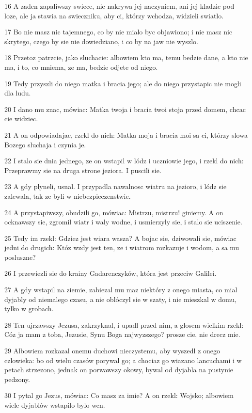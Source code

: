 \par 16 A zaden zapaliwszy swiece, nie nakrywa jej naczyniem, ani jej kladzie pod loze, ale ja stawia na swieczniku, aby ci, którzy wchodza, widzieli swiatlo.
\par 17 Bo nie masz nic tajemnego, co by nie mialo byc objawiono; i nie masz nic skrytego, czego by sie nie dowiedziano, i co by na jaw nie wyszlo.
\par 18 Przetoz patrzcie, jako sluchacie: albowiem kto ma, temu bedzie dane, a kto nie ma, i to, co mniema, ze ma, bedzie odjete od niego.
\par 19 Tedy przyszli do niego matka i bracia jego; ale do niego przystapic nie mogli dla ludu.
\par 20 I dano mu znac, mówiac: Matka twoja i bracia twoi stoja przed domem, chcac cie widziec.
\par 21 A on odpowiadajac, rzekl do nich: Matka moja i bracia moi sa ci, którzy slowa Bozego sluchaja i czynia je.
\par 22 I stalo sie dnia jednego, ze on wstapil w lódz i uczniowie jego, i rzekl do nich: Przeprawmy sie na druga strone jeziora. I puscili sie.
\par 23 A gdy plyneli, usnal. I przypadla nawalnosc wiatru na jezioro, i lódz sie zalewala, tak ze byli w niebezpieczenstwie.
\par 24 A przystapiwszy, obudzili go, mówiac: Mistrzu, mistrzu! giniemy. A on ocknawszy sie, zgromil wiatr i waly wodne, i usmierzyly sie, i stalo sie uciszenie.
\par 25 Tedy im rzekl: Gdziez jest wiara wasza? A bojac sie, dziwowali sie, mówiac jedni do drugich: Któz wzdy jest ten, ze i wiatrom rozkazuje i wodom, a sa mu posluszne?
\par 26 I przewiezli sie do krainy Gadarenczyków, która jest przeciw Galilei.
\par 27 A gdy wstapil na ziemie, zabiezal mu maz niektóry z onego miasta, co mial dyjably od niemalego czasu, a nie oblóczyl sie w szaty, i nie mieszkal w domu, tylko w grobach.
\par 28 Ten ujrzawszy Jezusa, zakrzyknal, i upadl przed nim, a glosem wielkim rzekl: Cóz ja mam z toba, Jezusie, Synu Boga najwyzszego? prosze cie, nie drecz mie.
\par 29 Albowiem rozkazal onemu duchowi nieczystemu, aby wyszedl z onego czlowieka: bo od wielu czasów porywal go; a chociaz go wiazano lancuchami i w petach strzezono, jednak on porwawszy okowy, bywal od dyjabla na pustynie pedzony.
\par 30 I pytal go Jezus, mówiac: Co masz za imie? A on rzekl: Wojsko; albowiem wiele dyjablów wstapilo bylo wen.
